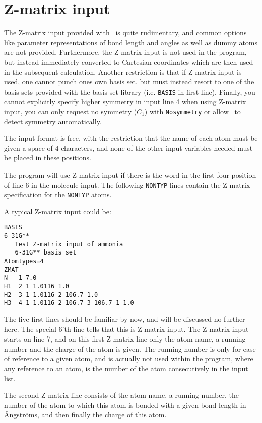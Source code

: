 \section{Z-matrix input}\label{sec:molzmat}

The Z-matrix input provided with \dalton\ is quite rudimentary, and
common options like parameter representations of bond length and
angles as well as dummy atoms are not provided. Furthermore,
the Z-matrix input is not used in the program, but instead immediately
converted to Cartesian coordinates which are then used in the
subsequent calculation.
Another restriction is that if Z-matrix input is used, one cannot
punch ones own basis set, but must instead resort to one of the basis sets
provided with the basis set library (i.e. {\tt BASIS} in first line).
Finally, you cannot explicitly specify higher symmetry in input line 4
when using Z-matrix input,
you can only request no symmetry ($C_1$) with \verb|Nosymmetry|
or allow \dalton\ to detect symmetry automatically.

The input format is free, with
the restriction that the name of each atom must be given a space
of 4 characters, and none of the other input variables needed must be
placed in these positions.

The program will use Z-matrix input if there is
the word  
in the first four position of line 6 in the molecule input.
The following {\tt NONTYP} lines contain the Z-matrix specification
for the {\tt NONTYP} atoms.

A typical Z-matrix input could be:
\begin{verbatim}
BASIS
6-31G**
   Test Z-matrix input of ammonia
   6-31G** basis set
Atomtypes=4
ZMAT
N   1 7.0
H1  2 1 1.0116 1.0
H2  3 1 1.0116 2 106.7 1.0
H3  4 1 1.0116 2 106.7 3 106.7 1 1.0
\end{verbatim}
The five first lines should be familiar by now, and will be discussed
no further here. 
The special 6'th line tells that this is Z-matrix input.
The Z-matrix input starts on line 7, and on this first Z-matrix
line only the atom name, a running number and the charge of the
atom
is given. The running number is only for
ease of reference to a given atom, and is actually not used within the
program, where any reference to an atom, is the number of the
atom consecutively in the input list.

The second Z-matrix line consists of the atom name, a running number, the
number of the atom to which this atom is bonded with a given bond
length in {\AA}ngstr{\"o}ms, and then finally the charge of this atom.

